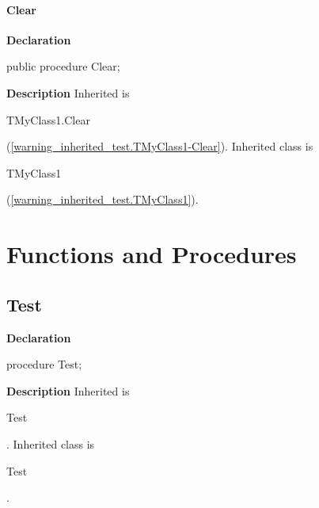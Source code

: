 \documentclass{report}
\begin{document}
\paragraph*{Clear}\hspace*{\fill}

\begin{list}{}{
\setlength{\itemindent}{0cm}
\setlength{\listparindent}{0cm}
\setlength{\leftmargin}{\evensidemargin}
\addtolength{\leftmargin}{\tmplength}
\settowidth{\labelsep}{X}
\addtolength{\leftmargin}{\labelsep}
\setlength{\labelwidth}{\tmplength}
}
\begin{flushleft}
\item[\textbf{Declaration}\hfill]
\begin{ttfamily}
public procedure Clear;\end{ttfamily}


\end{flushleft}
\par
\item[\textbf{Description}]
Inherited is \begin{ttfamily}TMyClass1.Clear\end{ttfamily}(\ref{warning_inherited_test.TMyClass1-Clear}). Inherited class is \begin{ttfamily}TMyClass1\end{ttfamily}(\ref{warning_inherited_test.TMyClass1}).

\end{list}
\section{Functions and Procedures}
\subsection*{Test}
\begin{list}{}{
\setlength{\itemindent}{0cm}
\setlength{\listparindent}{0cm}
\setlength{\leftmargin}{\evensidemargin}
\addtolength{\leftmargin}{\tmplength}
\settowidth{\labelsep}{X}
\addtolength{\leftmargin}{\labelsep}
\setlength{\labelwidth}{\tmplength}
}
\begin{flushleft}
\item[\textbf{Declaration}\hfill]
\begin{ttfamily}
procedure Test;\end{ttfamily}


\end{flushleft}
\par
\item[\textbf{Description}]
Inherited is \begin{ttfamily}Test\end{ttfamily}. Inherited class is \begin{ttfamily}Test\end{ttfamily}.

\end{list}
\end{document}
